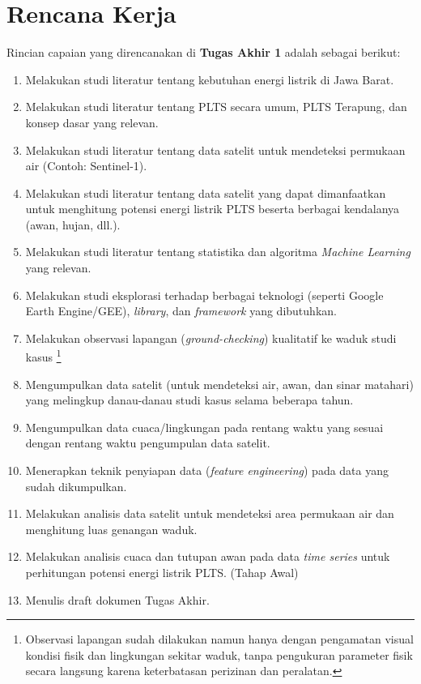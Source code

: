 \documentclass[a4paper,twoside]{article}
\begin{document}
\section{Rencana Kerja}
Rincian capaian yang direncanakan di \textbf{Tugas Akhir 1} adalah sebagai berikut:
\begin{enumerate}
	\item Melakukan studi literatur tentang kebutuhan energi listrik di Jawa Barat.
	\item Melakukan studi literatur tentang PLTS secara umum, PLTS
	      Terapung, dan konsep dasar yang relevan.
	\item Melakukan studi literatur tentang data satelit untuk mendeteksi permukaan air
	      (Contoh: Sentinel-1).
	\item Melakukan studi literatur tentang data satelit yang dapat
	      dimanfaatkan untuk menghitung potensi energi listrik PLTS beserta
	      berbagai kendalanya (awan, hujan, dll.).
	\item Melakukan studi literatur tentang statistika dan algoritma
	      \textit{Machine Learning} yang relevan.
	\item Melakukan studi eksplorasi terhadap berbagai teknologi (seperti
	      Google Earth Engine/GEE), \textit{library}, dan \textit{framework}
	      yang dibutuhkan.
	\item Melakukan observasi lapangan (\textit{ground-checking}) kualitatif ke waduk studi kasus
	      \footnote{Observasi lapangan sudah dilakukan namun hanya dengan pengamatan visual kondisi
		      fisik dan lingkungan sekitar waduk, tanpa pengukuran parameter fisik secara langsung
		      karena keterbatasan perizinan dan peralatan.}
	\item Mengumpulkan data satelit (untuk mendeteksi air, awan, dan sinar
	      matahari) yang melingkup danau-danau studi kasus selama beberapa
	      tahun.
	\item Mengumpulkan data cuaca/lingkungan pada rentang waktu yang sesuai
	      dengan rentang waktu pengumpulan data satelit.
	\item Menerapkan teknik penyiapan data (\textit{feature engineering})
	      pada data yang sudah dikumpulkan.
	\item Melakukan analisis data satelit untuk mendeteksi area permukaan
	      air dan menghitung luas genangan waduk.
	\item Melakukan analisis cuaca dan tutupan awan pada data \textit{time series}
	      untuk perhitungan potensi energi listrik PLTS. (Tahap Awal)
	\item Menulis draft dokumen Tugas Akhir.
\end{enumerate}
\end{document}

